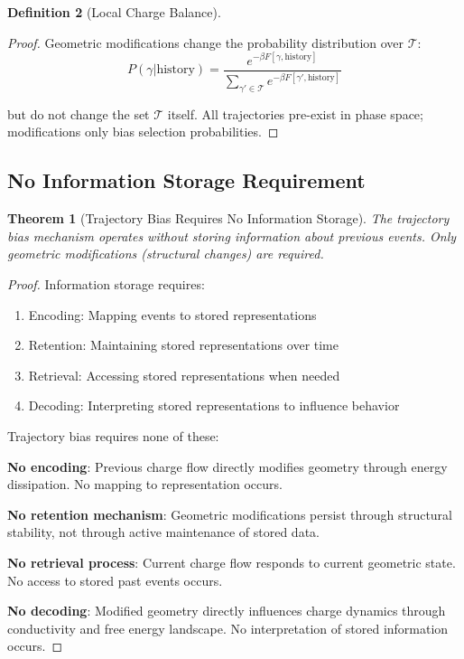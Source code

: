 \documentclass[12pt,a4paper]{article}
\theoremstyle{plain}
\newtheorem{theorem}{Theorem}[section]
\theoremstyle{definition}
\newtheorem{definition}[theorem]{Definition}
\theoremstyle{remark}
\begin{document}
\begin{definition}[Local Charge Balance]
\begin{proof}
Geometric modifications change the probability distribution over $\mathcal{T}$:
\begin{equation}
P(\gamma | \text{history}) = \frac{e^{-\beta F[\gamma,\text{history}]}}{\sum_{\gamma' \in \mathcal{T}} e^{-\beta F[\gamma',\text{history}]}}
\end{equation}

but do not change the set $\mathcal{T}$ itself. All trajectories pre-exist in phase space; modifications only bias selection probabilities.
\end{proof}

\subsection{No Information Storage Requirement}

\begin{theorem}[Trajectory Bias Requires No Information Storage]
\label{thm:no_storage_required}
The trajectory bias mechanism operates without storing information about previous events. Only geometric modifications (structural changes) are required.
\end{theorem}

\begin{proof}
Information storage requires:
\begin{enumerate}
\item Encoding: Mapping events to stored representations
\item Retention: Maintaining stored representations over time
\item Retrieval: Accessing stored representations when needed
\item Decoding: Interpreting stored representations to influence behavior
\end{enumerate}

Trajectory bias requires none of these:

\textbf{No encoding}: Previous charge flow directly modifies geometry through energy dissipation. No mapping to representation occurs.

\textbf{No retention mechanism}: Geometric modifications persist through structural stability, not through active maintenance of stored data.

\textbf{No retrieval process}: Current charge flow responds to current geometric state. No access to stored past events occurs.

\textbf{No decoding}: Modified geometry directly influences charge dynamics through conductivity and free energy landscape. No interpretation of stored information occurs.


\end{proof}
\end{definition}
\end{document}
